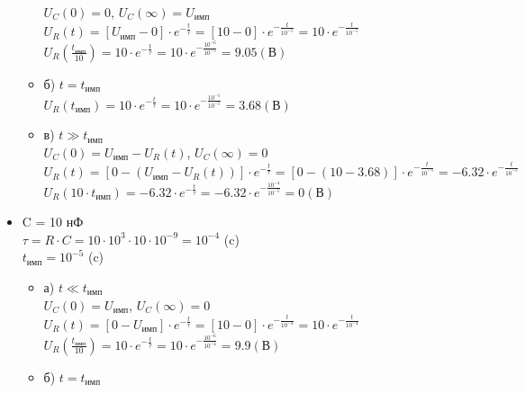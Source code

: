 \begin{itemize}
\begin{itemize}
		$U_C(0)	= 0$, $U_C(\infty) = U_\text{имп}$\\
		$U_R(t) = [U_\text{имп} - 0] \cdot e^{-\frac{t}{\tau}} = [10 - 0] \cdot e^{-\frac{t}{10^{-5}}} = 10 \cdot e^{-\frac{t}{10^{-5}}}$\\
		$U_R(\frac{t_\text{имп}}{10}) = 10 \cdot e^{-\frac{t}{\tau}} = 10 \cdot e^{-\frac{10^{-6}}{10^{-5}}} = 9.05 (\text{В})$\\

\item[] б) $t = t_\text{имп}$\\

		$U_R(t_\text{имп}) = 10 \cdot e^{-\frac{t}{\tau}} = 10 \cdot e^{-\frac{10^{-5}}{10^{-5}}} = 3.68 (\text{В})$\\

	
\item[] в) $t \gg t_\text{имп}$\\

		$U_C(0)	= U_\text{имп} - U_R(t)$, $U_C(\infty) = 0$\\
		$U_R(t) = [0 - (U_\text{имп} - U_R(t))] \cdot e^{-\frac{t}{\tau}} = [0 - (10 - 3.68)] \cdot e^{-\frac{t}{10^{-5}}} = -6.32 \cdot e^{-\frac{t}{10^{-5}}}$\\
		$U_R(10 \cdot t_\text{имп}) = -6.32 \cdot e^{-\frac{t}{\tau}} = -6.32 \cdot e^{-\frac{10^{-4}}{10^{-5}}} = 0 (\text{В})$\\

\end{itemize}

\item C = 10 нФ\\

		$\tau = R \cdot C = 10 \cdot 10^3 \cdot 10 \cdot 10^{-9} = 10^{-4}$ (c)\\
		$t_\text{имп} = 10^{-5}$ (c)

\begin{itemize}
\item[] а) $t \ll t_\text{имп}$\\

		$U_C(0)	= U_\text{имп}$, $U_C(\infty) = 0$\\		
		$U_R(t) = [0 - U_\text{имп}] \cdot e^{-\frac{t}{\tau}} = [10 - 0] \cdot e^{-\frac{t}{10^{-4}}} = 10 \cdot e^{-\frac{t}{10^{-4}}}$\\
		$U_R(\frac{t_\text{имп}}{10}) = 10 \cdot e^{-\frac{t}{\tau}} = 10 \cdot e^{-\frac{10^{-6}}{10^{-4}}} = 9.9 (\text{В})$\\

\item[] б) $t = t_\text{имп}$\\


\end{itemize}
\end{itemize}

